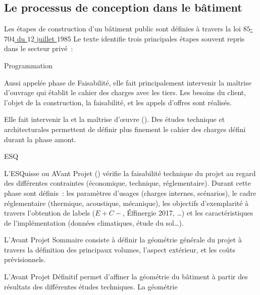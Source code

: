 \subsection{Le processus de conception dans le bâtiment} %
\label{sub:le_processus_de_conception_dans_le_batiment}
Les étapes de construction d’un bâtiment public sont définies à travers la loi
\href{https://www.legifrance.gouv.fr/affichTexte.do?cidTexte=JORFTEXT000000693683}{$85$-$704$ du $12$ juillet $1985$}
Le texte identifie trois principales étapes souvent repris dans le secteur privé~:
\begin{blockdescription}{Programmation}
    \item[Programmation] Aussi appelée phase de Faisabilité, elle fait principalement intervenir la
          maîtrise d’ouvrage qui établit le cahier des charges avec les tiers. Les besoins
          du client, l’objet de la construction, la faisabilité, et les appels d’offres
          sont réalisés.
    \item[Conception] Elle fait intervenir la  et la maîtrise d’œuvre ().
          Des études technique et architecturales permettent de définir plus finement le cahier des charges
          défini durant la phase amont.
          \begin{blockdescription}{ESQ}
              \item [\abr{ESQ}] L’ESQuisse ou AVant Projet () vérifie la faisabilité technique du projet au regard
                    des différentes contraintes (économique, technique, réglementaire). Durant cette
                    phase sont définis~: les paramètres d’usages
                    (charges internes, scénarios), le cadre réglementaire (thermique, acoustique, mécanique),
                    les objectifs d’exemplarité à travers l’obtention de labels ($E+C-$,
                     Éffinergie 2017, \dots) et les caractéristiques de l’implémentation
                    (données climatiques, étude du sol\dots).
              \item [\abr{APS}] L’Avant Projet Sommaire consiste à définir la géométrie générale
                    du projet à travers la définition des principaux volumes, l’aspect extérieur,
                    et les coûts prévisionnels.
              \item [\abr{APD}] L’Avant Projet Définitif permet d’affiner la géométrie du bâtiment
                    à partir des résultats des différentes études techniques. La géométrie

\end{blockdescription}
\end{blockdescription}
